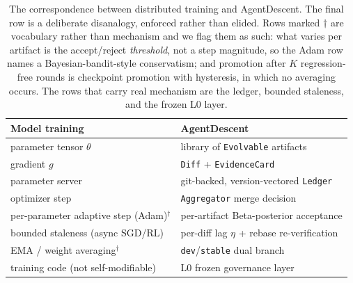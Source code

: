 \documentclass{article}
\newcommand{\code}[1]{\texttt{#1}}
\begin{document}
\begin{table}[t]
\centering
\small
\caption{The correspondence between distributed training and AgentDescent. The final row is a deliberate disanalogy, enforced rather than elided. Rows marked $\dagger$ are vocabulary rather than mechanism and we flag them as such: what varies per artifact is the accept/reject \emph{threshold}, not a step magnitude, so the Adam row names a Bayesian-bandit-style conservatism; and promotion after $K$ regression-free rounds is checkpoint promotion with hysteresis, in which no averaging occurs. The rows that carry real mechanism are the ledger, bounded staleness, and the frozen L0 layer.}
\label{tab:analogy}
\begin{tabular}{@{}ll@{}}
\toprule
\textbf{Model training} & \textbf{AgentDescent} \\
\midrule
parameter tensor $\theta$ & library of \code{Evolvable} artifacts \\
gradient $g$ & \code{Diff} + \code{EvidenceCard} \\
parameter server & git-backed, version-vectored \code{Ledger} \\
optimizer step & \code{Aggregator} merge decision \\
per-parameter adaptive step (Adam)$^{\dagger}$ & per-artifact Beta-posterior acceptance \\
bounded staleness (async SGD/RL) & per-diff lag $\eta$ + rebase re-verification \\
EMA / weight averaging$^{\dagger}$ & \code{dev}/\code{stable} dual branch \\
training code (not self-modifiable) & L0 frozen governance layer \\
\bottomrule
\end{tabular}
\end{table}
\end{document}
